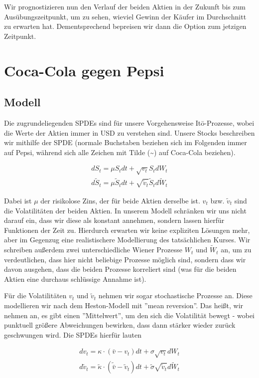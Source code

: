 \documentclass[12pt]{article}
\begin{document}
Wir prognostizieren nun den Verlauf der beiden Aktien in der Zukunft bis zum Ausübungszeitpunkt, um zu sehen, wieviel Gewinn der Käufer im Durchschnitt zu erwarten hat. Dementsprechend bepreisen wir dann die Option zum jetzigen Zeitpunkt.


\section{Coca-Cola gegen Pepsi}

\subsection{Modell}

Die zugrundeliegenden SPDEs sind für unsere Vorgehensweise It\={o}-Prozesse, wobei die Werte der Aktien immer in USD zu verstehen sind. Unsere Stocks beschreiben wir mithilfe der SPDE (normale Buchstaben beziehen sich im Folgenden immer auf Pepsi, während sich alle Zeichen mit Tilde (\~{}) auf Coca-Cola beziehen).

\begin{align}\label{SPDEstock}
dS_t = \mu S_t dt + \sqrt{v_t} S_t dW_t \\
d\tilde{S}_t = \mu \tilde{S}_t dt + \sqrt{\tilde{v}_t} \tilde{S}_t d\tilde{W}_t
\end{align}

Dabei ist $\mu$ der risikolose Zins, der für beide Aktien derselbe ist. $v_t$ bzw. $\tilde{v}_t$ sind die Volatilitäten der beiden Aktien. In unserem Modell schränken wir uns nicht darauf ein, dass wir diese als konstant annehmen, sondern lassen hierfür Funktionen der Zeit zu. Hierdurch erwarten wir keine expliziten Lösungen mehr, aber im Gegenzug eine realistischere Modellierung des tatsächlichen Kurses. Wir schreiben außerdem zwei unterschiedliche Wiener Prozesse $W_t$ und $\tilde{W}_t$ an, um zu verdeutlichen, dass hier nicht beliebige Prozesse möglich sind, sondern dass wir davon ausgehen, dass die beiden Prozesse korreliert sind (was für die beiden Aktien eine durchaus schlüssige Annahme ist).

Für die Volatilitäten $v_t$ und $\tilde{v}_t$ nehmen wir sogar stochastische Prozesse an. Diese modellieren wir nach dem Heston-Modell mit ''mean reversion''. Das heißt, wir nehmen an, es gibt einen ''Mittelwert'', um den sich die Volatilität bewegt - wobei punktuell größere Abweichungen bewirken, dass dann stärker wieder zurück geschwungen wird. Die SPDEs hierfür lauten

\begin{align} \label{SPDEvol}
dv_t = \kappa\cdot(\bar{v}-v_t) dt + \sigma \sqrt{v_t}dW_t \\
d\tilde{v}_t = \tilde{\kappa}\cdot(\tilde{\bar{v}}-\tilde{v}_t) dt + \tilde{\sigma} \sqrt{\tilde{v}_t}d\tilde{W}_t
\end{align}
\end{document}
